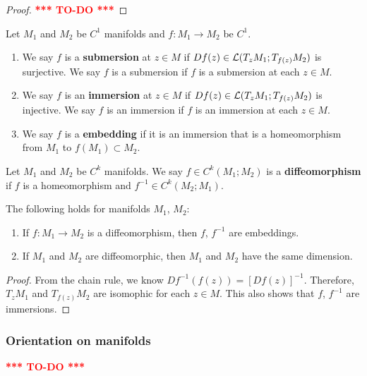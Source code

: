 \documentclass[a4paper]{article}
\newcommand{\TODO}{\textcolor{red}{\textbf{*** TO-DO ***}}}
\begin{document}
\begin{proof}
\TODO
\end{proof} 

\begin{defi}
Let $M_1$ and $M_2$ be $C^1$ manifolds and $f: M_1 \to M_2$
be $C^1$. 
\begin{enumerate}
\item We say $f$ is a \textbf{submersion} at $z \in M$ if 
$Df(z) \in \mathcal{L}(T_z M_1 ; T_{f(z)} M_2)$ is surjective. We 
say $f$ is a submersion if $f$ is a submersion at each 
$z \in M$.
\item We say $f$ is an \textbf{immersion} at $z \in M$ if 
$Df(z) \in \mathcal{L}(T_z M_1 ; T_{f(z)} M_2)$ is injective. We 
say $f$ is an immersion if $f$ is an immersion at each 
$z \in M$.
\item We say $f$ is a \textbf{embedding} if it is an 
immersion that is a homeomorphism from $M_1$ to $f(M_1) 
\subset M_2$.
\end{enumerate}
\end{defi}

\begin{defi}[diffeomorphism]
Let $M_1$ and $M_2$ be $C^k$ manifolds. We say $f \in 
C^k(M_1; M_2)$ is a \textbf{diffeomorphism} if $f$ is a 
homeomorphism and $f^{-1} \in C^k(M_2; M_1)$.
\end{defi}

\begin{prop}
The following holds for manifolds $M_1$, $M_2$: 
\begin{enumerate}
  \item If $f: M_1 \to M_2$ is a diffeomorphism, then 
  $f$, $f^{-1}$ are embeddings.
  \item If $M_1$ and $M_2$ are diffeomorphic, then $M_1$
  and $M_2$ have the same dimension.
\end{enumerate}
\end{prop}

\begin{proof}
From the chain rule, we know $Df^{-1}(f(z)) = [Df(z)]^{-1}$.
Therefore, $T_z M_1$ and $T_{f(z)} M_2$ are isomophic for each 
$z \in M$. This also shows that $f$, $f^{-1}$ are immersions.
\end{proof}

\subsubsection{Orientation on manifolds}

\TODO
\end{document}
